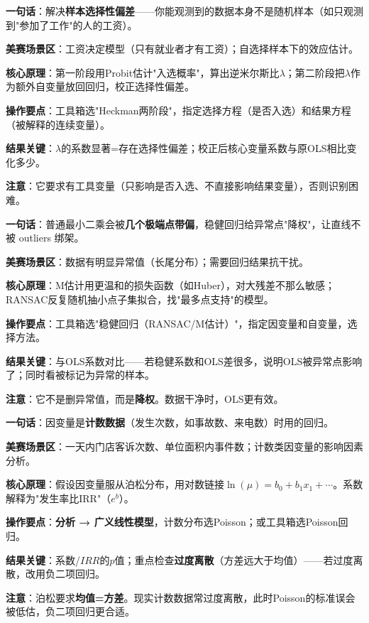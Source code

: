 
\begin{algobrief}
\textbf{一句话}：解决\textbf{样本选择性偏差}——你能观测到的数据本身不是随机样本（如只观测到"参加了工作"的人的工资）。

\textbf{美赛场景区}：工资决定模型（只有就业者才有工资）；自选择样本下的效应估计。

\textbf{核心原理}：第一阶段用Probit估计"入选概率"，算出逆米尔斯比$\lambda$；第二阶段把$\lambda$作为额外自变量放回回归，校正选择性偏差。

\textbf{操作要点}：工具箱选"Heckman两阶段"，指定选择方程（是否入选）和结果方程（被解释的连续变量）。

\textbf{结果关键}：$\lambda$的系数显著=存在选择性偏差；校正后核心变量系数与原OLS相比变化多少。

\textbf{注意}：它要求有工具变量（只影响是否入选、不直接影响结果变量），否则识别困难。
\end{algobrief}


\begin{algobrief}
\textbf{一句话}：普通最小二乘会被\textbf{几个极端点带偏}，稳健回归给异常点"降权"，让直线不被 outliers 绑架。

\textbf{美赛场景区}：数据有明显异常值（长尾分布）；需要回归结果抗干扰。

\textbf{核心原理}：M估计用更温和的损失函数（如Huber），对大残差不那么敏感；RANSAC反复随机抽小点子集拟合，找"最多点支持"的模型。

\textbf{操作要点}：工具箱选"稳健回归（RANSAC/M估计）"，指定因变量和自变量，选择方法。

\textbf{结果关键}：与OLS系数对比——若稳健系数和OLS差很多，说明OLS被异常点影响了；同时看被标记为异常的样本。

\textbf{注意}：它不是删异常值，而是\textbf{降权}。数据干净时，OLS更有效。
\end{algobrief}


\begin{algobrief}
\textbf{一句话}：因变量是\textbf{计数数据}（发生次数，如事故数、来电数）时用的回归。

\textbf{美赛场景区}：一天内门店客诉次数、单位面积内事件数；计数类因变量的影响因素分析。

\textbf{核心原理}：假设因变量服从泊松分布，用对数链接$\ln(\mu)=b_0+b_1x_1+\cdots$。系数解释为"发生率比IRR"（$e^b$）。

\textbf{操作要点}：\textbf{分析 → 广义线性模型}，计数分布选Poisson；或工具箱选Poisson回归。

\textbf{结果关键}：系数/$IRR$的$p$值；重点检查\textbf{过度离散}（方差远大于均值）——若过度离散，改用负二项回归。

\textbf{注意}：泊松要求\textbf{均值=方差}。现实计数数据常过度离散，此时Poisson的标准误会被低估，负二项回归更合适。
\end{algobrief}

